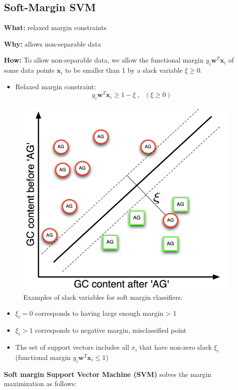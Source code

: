 \documentclass[12pt, a4paper]{article}
\begin{document}
\subsection{Soft-Margin SVM}\label{soft-margin-svm}

\textbf{What:} relaxed margin constraints

\textbf{Why:} allows non-separable data

\textbf{How:} To allow non-separable data, we allow the functional margin $y_i \mathbf{w}^T \mathbf{x}_i$ of some data points $\mathbf{x}_i$ to be smaller than 1 by a slack variable $\xi \geq 0$.

\begin{itemize}
  \item Relaxed margin constraint:
  $$
  y_i \mathbf{w}^T \mathbf{x}_i \geq 1 -\xi \;,\;\; (\xi \geq 0)
  $$
\end{itemize}

\begin{figure}[H]
\centering
  \includegraphics[width=0.6\columnwidth]{images/slack-variables-for-soft-margin-classifiers.png}
  \caption{Examples of slack variables for soft margin classifiers.}
  \label{fig:slack-variables-for-soft-margin-classifiers}
\end{figure}
\begin{itemize}
  \item $\xi_i = 0$ corresponds to having large enough margin > 1
  \item $\xi_i > 1$ corresponds to negative margin, misclassified point
  \item The set of support vectors includes all $x_i$ that have non-zero slack $\xi_i$ (functional margin $y_i \mathbf{w}^T \mathbf{x}_i \leq 1$)
\end{itemize}




\textbf{Soft margin Support Vector Machine (SVM)} solves the margin maximization as follows:
\end{document}
